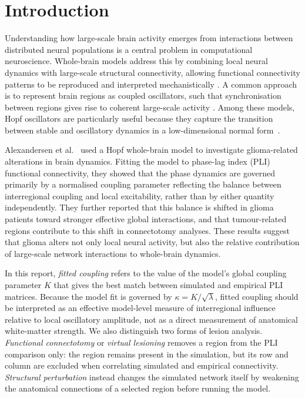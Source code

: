 \documentclass[11pt, reprint, aps, prl, floatfix, secnumarabic]{revtex4-2}
\begin{document}
\maketitle

\section{Introduction}
Understanding how large-scale brain activity emerges from interactions between distributed neural populations is a central problem in computational neuroscience. Whole-brain models address this by combining local neural dynamics with large-scale structural connectivity, allowing functional connectivity patterns to be reproduced and interpreted mechanistically \cite{Deco2011,Deco2014}. A common approach is to represent brain regions as coupled oscillators, such that synchronisation between regions gives rise to coherent large-scale activity \cite{Cabral2011}. Among these models, Hopf oscillators are particularly useful because they capture the transition between stable and oscillatory dynamics in a low-dimensional normal form~\cite{Freyer2011}.

Alexandersen et al.~\cite{Alexandersen2025} used a Hopf whole-brain model to investigate glioma-related alterations in brain dynamics. Fitting the model to phase-lag index (PLI) functional connectivity, they showed that the phase dynamics are governed primarily by a normalised coupling parameter reflecting the balance between interregional coupling and local excitability, rather than by either quantity independently. They further reported that this balance is shifted in glioma patients toward stronger effective global interactions, and that tumour-related regions contribute to this shift in connectotomy analyses. These results suggest that glioma alters not only local neural activity, but also the relative contribution of large-scale network interactions to whole-brain dynamics.

In this report, \emph{fitted coupling} refers to the value of the model's global coupling parameter $K$ that gives the best match between simulated and empirical PLI matrices. Because the model fit is governed by $\kappa = K/\sqrt{\lambda}$, fitted coupling should be interpreted as an effective model-level measure of interregional influence relative to local oscillatory amplitude, not as a direct measurement of anatomical white-matter strength. We also distinguish two forms of lesion analysis. \emph{Functional connectotomy} or \emph{virtual lesioning} removes a region from the PLI comparison only: the region remains present in the simulation, but its row and column are excluded when correlating simulated and empirical connectivity. \emph{Structural perturbation} instead changes the simulated network itself by weakening the anatomical connections of a selected region before running the model.
\end{document}
